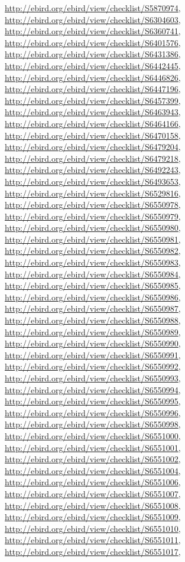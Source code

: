 \documentclass[9pt, article]{memoir}
\begin{document}
\begin{multicols}{2}
\url{http://ebird.org/ebird/view/checklist/S5870974}, 
\url{http://ebird.org/ebird/view/checklist/S6304603}, 
\url{http://ebird.org/ebird/view/checklist/S6360741}, 
\url{http://ebird.org/ebird/view/checklist/S6401576}, 
\url{http://ebird.org/ebird/view/checklist/S6431386}, 
\url{http://ebird.org/ebird/view/checklist/S6442445}, 
\url{http://ebird.org/ebird/view/checklist/S6446826}, 
\url{http://ebird.org/ebird/view/checklist/S6447196}, 
\url{http://ebird.org/ebird/view/checklist/S6457399}, 
\url{http://ebird.org/ebird/view/checklist/S6463943}, 
\url{http://ebird.org/ebird/view/checklist/S6464166}, 
\url{http://ebird.org/ebird/view/checklist/S6470158}, 
\url{http://ebird.org/ebird/view/checklist/S6479204}, 
\url{http://ebird.org/ebird/view/checklist/S6479218}, 
\url{http://ebird.org/ebird/view/checklist/S6492243}, 
\url{http://ebird.org/ebird/view/checklist/S6493653}, 
\url{http://ebird.org/ebird/view/checklist/S6529816}, 
\url{http://ebird.org/ebird/view/checklist/S6550978}, 
\url{http://ebird.org/ebird/view/checklist/S6550979}, 
\url{http://ebird.org/ebird/view/checklist/S6550980}, 
\url{http://ebird.org/ebird/view/checklist/S6550981}, 
\url{http://ebird.org/ebird/view/checklist/S6550982}, 
\url{http://ebird.org/ebird/view/checklist/S6550983}, 
\url{http://ebird.org/ebird/view/checklist/S6550984}, 
\url{http://ebird.org/ebird/view/checklist/S6550985}, 
\url{http://ebird.org/ebird/view/checklist/S6550986}, 
\url{http://ebird.org/ebird/view/checklist/S6550987}, 
\url{http://ebird.org/ebird/view/checklist/S6550988}, 
\url{http://ebird.org/ebird/view/checklist/S6550989}, 
\url{http://ebird.org/ebird/view/checklist/S6550990}, 
\url{http://ebird.org/ebird/view/checklist/S6550991}, 
\url{http://ebird.org/ebird/view/checklist/S6550992}, 
\url{http://ebird.org/ebird/view/checklist/S6550993}, 
\url{http://ebird.org/ebird/view/checklist/S6550994}, 
\url{http://ebird.org/ebird/view/checklist/S6550995}, 
\url{http://ebird.org/ebird/view/checklist/S6550996}, 
\url{http://ebird.org/ebird/view/checklist/S6550998}, 
\url{http://ebird.org/ebird/view/checklist/S6551000}, 
\url{http://ebird.org/ebird/view/checklist/S6551001}, 
\url{http://ebird.org/ebird/view/checklist/S6551002}, 
\url{http://ebird.org/ebird/view/checklist/S6551004}, 
\url{http://ebird.org/ebird/view/checklist/S6551006}, 
\url{http://ebird.org/ebird/view/checklist/S6551007}, 
\url{http://ebird.org/ebird/view/checklist/S6551008}, 
\url{http://ebird.org/ebird/view/checklist/S6551009}, 
\url{http://ebird.org/ebird/view/checklist/S6551010}, 
\url{http://ebird.org/ebird/view/checklist/S6551011}, 
\url{http://ebird.org/ebird/view/checklist/S6551017}, 

\end{multicols}
\end{document}
